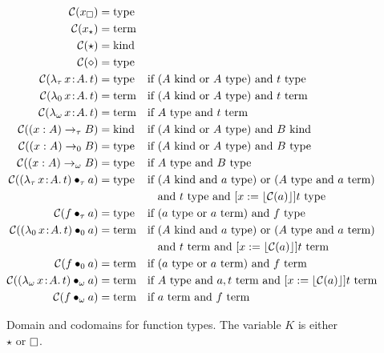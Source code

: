 \begin{figure}
    \centering
    \begin{align*}
        \mathcal{C}(x_\square) &=\!\! \ptype \\
        \mathcal{C}(x_\star) &=\!\! \pterm \\
        \mathcal{C}(\star) &=\!\! \pkind \\
        \mathcal{C}(\diamond) &=\!\! \ptype \\
        \mathcal{C}(\abs{\lambda_\tau}{x}{A}{t}) &=\!\! \ptype &\text{if }& (A\pkind \text{ or } A\ptype) \text{ and } t\ptype \\
        \mathcal{C}(\abs{\lambda_0}{x}{A}{t}) &=\!\! \pterm &\text{if }& (A\pkind \text{ or } A\ptype) \text{ and } t\pterm \\
        \mathcal{C}(\abs{\lambda_\omega}{x}{A}{t}) &=\!\! \pterm &\text{if }& A\ptype \text{ and } t\pterm \\
        \mathcal{C}((x : A) \to_\tau B) &=\!\! \pkind &\text{if }& (A\pkind \text{ or } A\ptype) \text{ and } B\pkind \\
        \mathcal{C}((x : A) \to_0 B) &=\!\! \ptype &\text{if }& (A\pkind \text{ or } A\ptype) \text{ and } B\ptype \\
        \mathcal{C}((x : A) \to_\omega B) &=\!\! \ptype &\text{if }& A\ptype \text{ and } B\ptype \\
        \mathcal{C}(\app{(\abs{\lambda_\tau}{x}{A}{t})}{\tau}{a}) &=\!\! \ptype &\text{if }& (A\pkind \text{ and } a\ptype) \text{ or } (A\ptype \text{ and } a\pterm) \\
            &&&\text{and } t\ptype \text{ and } [x := \ptrunc{\mathcal{C}(a)}]t\ptype \\
        \mathcal{C}(\app{f}{\tau}{a}) &=\!\! \ptype &\text{if }& (a\ptype \text{ or } a\pterm) \text{ and } f\ptype \\
        \mathcal{C}(\app{(\abs{\lambda_0}{x}{A}{t})}{0}{a}) &=\!\! \pterm &\text{if }& (A\pkind \text{ and } a\ptype) \text{ or } (A\ptype \text{ and } a\pterm) \\
            &&&\text{and } t\pterm \text{ and } [x := \ptrunc{\mathcal{C}(a)}]t\pterm \\
        \mathcal{C}(\app{f}{0}{a}) &=\!\! \pterm &\text{if }& (a\ptype \text{ or } a\pterm) \text{ and } f\pterm \\
        \mathcal{C}(\app{(\abs{\lambda_\omega}{x}{A}{t})}{\omega}{a}) &=\!\! \pterm &\text{if }& A\ptype \text{ and } a, t\pterm \text{ and } [x := \ptrunc{\mathcal{C}(a)}]t\pterm \\
        \mathcal{C}(\app{f}{\omega}{a}) &=\!\! \pterm &\text{if }& a\pterm \text{ and } f\pterm
    \end{align*}
    \caption{Domain and codomains for function types. The variable $K$ is either $\star$ or $\kind$.}
\end{figure}

